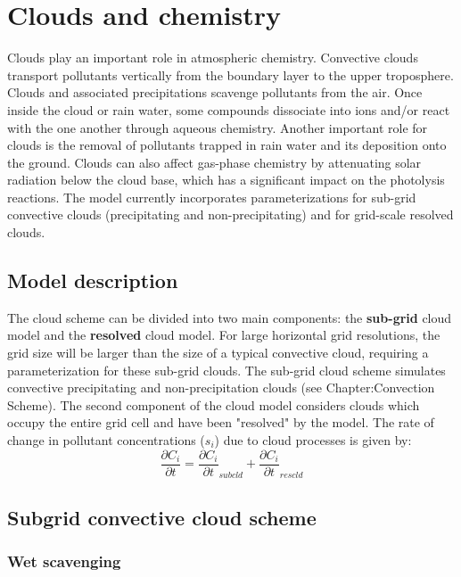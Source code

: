 \chapter{Clouds and chemistry}
\minitoc
%
Clouds play an important role in atmospheric chemistry.
Convective clouds transport pollutants vertically from the boundary layer to 
the upper troposphere. Clouds and associated precipitations scavenge pollutants 
from the air. Once inside the cloud or rain water, some compounds 
dissociate into ions and/or react with the one another through aqueous 
chemistry.
Another important role for clouds is the removal of pollutants trapped in 
rain water and its deposition onto the ground. Clouds can also affect 
gas-phase chemistry by attenuating solar radiation below the cloud base,
which has a significant impact on the photolysis reactions. 
The model currently incorporates parameterizations for sub-grid convective 
clouds (precipitating and non-precipitating) and for grid-scale 
resolved clouds. 
\section{Model description}
The cloud scheme can be divided into two main components: the 
{\bf sub-grid} cloud model and the {\bf resolved} cloud model. 
For large horizontal grid resolutions, the grid size will be larger than the 
size of a typical convective cloud, requiring a parameterization for these
sub-grid clouds. The sub-grid cloud scheme simulates convective 
precipitating and non-precipitation clouds (see Chapter:Convection Scheme).
The second component of the cloud model considers clouds which occupy the 
entire grid cell and have been "resolved" by the model. The rate of change in 
pollutant concentrations ($s_i$) due to cloud processes is given by:
$$
\frac{\partial C_i}{\partial t} = \frac{\partial C_i}{\partial t}_{subcld} 
+ \frac{\partial C_i}{\partial t}_{rescld}
$$
\section{Subgrid convective cloud scheme}
\subsection{Wet scavenging}

